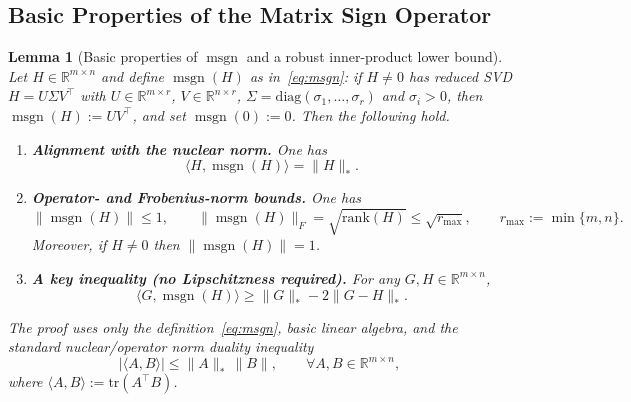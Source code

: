 \documentclass{article}
\newtheorem{lemma}{Lemma}
\begin{document}
\subsection{Basic Properties of the Matrix Sign Operator}
\label{subsec:msgn-basic}

\begin{lemma}[Basic properties of $\operatorname{msgn}$ and a robust inner-product lower bound]
\label{lem:sudamuon-msgn-basic}
Let $H\in\mathbb{R}^{m\times n}$ and define $\operatorname{msgn}(H)$ as in~\eqref{eq:msgn}: if $H\neq 0$ has reduced SVD $H=U\Sigma V^{\top}$ with $U\in\mathbb{R}^{m\times r}$, $V\in\mathbb{R}^{n\times r}$, $\Sigma=\mathrm{diag}(\sigma_1,\dots,\sigma_r)$ and $\sigma_i>0$, then $\operatorname{msgn}(H):=UV^{\top}$, and set $\operatorname{msgn}(0):=0$.
Then the following hold.
\begin{enumerate}
\item \textbf{Alignment with the nuclear norm.} One has
\begin{equation}
\langle H,\operatorname{msgn}(H)\rangle = \|H\|_*.
\end{equation}
\item \textbf{Operator- and Frobenius-norm bounds.} One has
\begin{equation}
\|\operatorname{msgn}(H)\|\le 1,\qquad \|\operatorname{msgn}(H)\|_F = \sqrt{\mathrm{rank}(H)}\le \sqrt{r_{\max}},\qquad r_{\max}:=\min\{m,n\}.
\end{equation}
Moreover, if $H\neq 0$ then $\|\operatorname{msgn}(H)\|=1$.
\item \textbf{A key inequality (no Lipschitzness required).} For any $G,H\in\mathbb{R}^{m\times n}$,
\begin{equation}
\label{eq:msgn-robust-ip-lb}
\langle G,\operatorname{msgn}(H)\rangle \ge \|G\|_* - 2\|G-H\|_*.
\end{equation}
\end{enumerate}
The proof uses only the definition~\eqref{eq:msgn}, basic linear algebra, and the standard nuclear/operator norm duality inequality
\begin{equation}
\label{eq:nuc-op-duality}
|\langle A,B\rangle| \le \|A\|_*\,\|B\|,\qquad \forall A,B\in\mathbb{R}^{m\times n},
\end{equation}
where $\langle A,B\rangle:=\mathrm{tr}(A^{\top}B)$.
\end{lemma}
\end{document}
